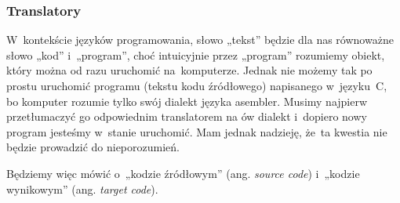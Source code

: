 \documentclass[10pt,t]{beamer}
\begin{document}





\begin{frame}
  \frametitle{Translatory}




  W~kontekście języków programowania, słowo „tekst” będzie dla nas
  równoważne słowo „kod” i~„program”, choć intuicyjnie przez „program”
  rozumiemy obiekt, który można od razu uruchomić na~komputerze. Jednak nie
  możemy tak po prostu uruchomić programu (tekstu kodu źródłowego)
  napisanego w~języku~C, bo komputer rozumie tylko swój dialekt języka
  asembler. Musimy najpierw przetłumaczyć go odpowiednim translatorem na ów
  dialekt i~dopiero nowy program jesteśmy w~stanie uruchomić. Mam jednak
  nadzieję, że~ta kwestia nie będzie prowadzić do nieporozumień.

  Będziemy więc mówić o~„kodzie źródłowym” (ang. \textit{source code})
  i~„kodzie wynikowym” (ang. \textit{target code}).













\end{frame}
\end{document}
